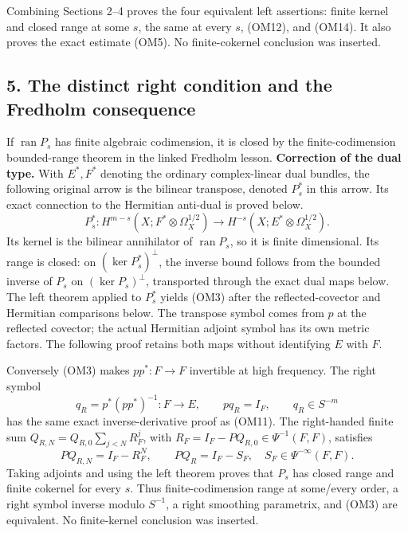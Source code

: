 \documentclass[
  11pt,
]{article}
\makeatletter
\let\ReaderOriginalAnchorStart\hyper@anchorstart
\let\ReaderOriginalAnchorEnd\hyper@anchorend
\let\ReaderPendingAliases\@empty
\def\ReaderArmAliases#1{\gdef\ReaderPendingAliases{#1}}
\def\hyper@anchorstart#1{\ReaderIfNativeAnchorTF{#1}{\ReaderPendingAliases\global\let\ReaderPendingAliases\@empty}{}\ReaderOriginalAnchorStart{#1}}
\makeatother
\begin{document}
Combining Sections 2--4 proves the four equivalent left assertions:
finite kernel and closed range at some \(s\), the same at every \(s\),
(OM12), and (OM14). It also proves the exact estimate (OM5). No
finite-cokernel conclusion was inserted.

\ReaderArmAliases{\ReaderOriginalAnchorStart{AN03-OMF-005}\ReaderOriginalAnchorEnd\begingroup\expandafter\def\csname @currentHref\endcsname{AN03-OMF-005}\label{AN03-OMF-005}\endgroup\ReaderOriginalAnchorStart{5-the-distinct-right-condition-and-the-fredholm-consequence}\ReaderOriginalAnchorEnd\begingroup\expandafter\def\csname @currentHref\endcsname{5-the-distinct-right-condition-and-the-fredholm-consequence}\label{5-the-distinct-right-condition-and-the-fredholm-consequence}\endgroup}
\subsection{5. The distinct right condition and the Fredholm
consequence}\label{the-distinct-right-condition-and-the-fredholm-consequence}

If \(\operatorname{ran}P_s\) has finite algebraic codimension, it is
closed by the finite-codimension bounded-range theorem in the linked
Fredholm lesson. \textbf{Correction of the dual type.} With \(E^*,F^*\)
denoting the ordinary complex-linear dual bundles, the following
original arrow is the bilinear transpose, denoted \(P_s^*\) in this
arrow. Its exact connection to the Hermitian anti-dual is proved below.
\[
 P_s^*:H^{m-s}(X;F^*\otimes\Omega_X^{1/2})
          \longrightarrow H^{-s}(X;E^*\otimes\Omega_X^{1/2}).
 \tag{OM16}
\] Its kernel is the bilinear annihilator of \(\operatorname{ran}P_s\),
so it is finite dimensional. Its range is closed: on
\((\ker P_s^*)^\perp\), the inverse bound follows from the bounded
inverse of \(P_s\) on \((\ker P_s)^\perp\), transported through the
exact dual maps below. The left theorem applied to \(P_s^*\) yields
(OM3) after the reflected-covector and Hermitian comparisons below. The
transpose symbol comes from \(p\) at the reflected covector; the actual
Hermitian adjoint symbol has its own metric factors. The following proof
retains both maps without identifying \(E\) with \(F\).

Conversely (OM3) makes \(pp^*:F\to F\) invertible at high frequency. The
right symbol \[
 q_R=p^*(pp^*)^{-1}:F\longrightarrow E,\qquad
 pq_R=I_F,\qquad q_R\in S^{-m}
 \tag{OM17}
\] has the same exact inverse-derivative proof as (OM11). The
right-handed finite sum \(Q_{R,N}=Q_{R,0}\sum_{j<N}R_F^j\), with
\(R_F=I_F-PQ_{R,0}\in\Psi^{-1}(F,F)\), satisfies \[
 PQ_{R,N}=I_F-R_F^N,\qquad
 PQ_R=I_F-S_F,\quad S_F\in\Psi^{-\infty}(F,F).
 \tag{OM18}
\] Taking adjoints and using the left theorem proves that \(P_s\) has
closed range and finite cokernel for every \(s\). Thus
finite-codimension range at some/every order, a right symbol inverse
modulo \(S^{-1}\), a right smoothing parametrix, and (OM3) are
equivalent. No finite-kernel conclusion was inserted.
\end{document}
